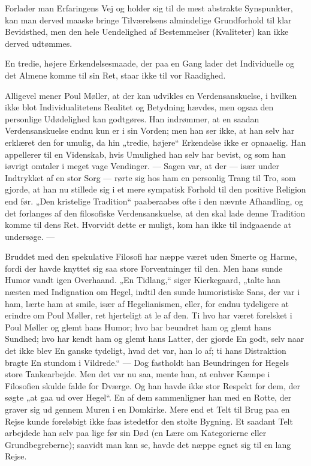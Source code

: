 \documentclass[12pt,a4paper,openany]{book}
\newcommand{\opage}[1]{\marginnote{\footnotesize\textit{[#1]}}}
\begin{document}
Forlader man Erfaringens Vej og holder sig til de mest abstrakte Synspunkter,
kan man derved maaske bringe Tilværelsens almindelige Grundforhold til klar
Bevidsthed, men den hele Uendelighed af Bestemmelser (Kvaliteter) kan ikke
derved udtømmes.

En tredie, højere Erkendelsesmaade, der paa en Gang lader det Individuelle og
det Almene komme til sin Ret, staar ikke til vor Raadighed.

Alligevel mener Poul Møller, at der kan udvikles en Verdensanskuelse, i hvilken
ikke blot Individualitetens Realitet og Betydning hævdes, men ogsaa den
personlige Udødelighed kan godtgøres. Han indrømmer, at en saadan
Verdensanskuelse endnu kun er i sin Vorden; men han ser ikke, at han selv har
erklæret den for umulig, da hin „tredie, højere“
\setcounter{footnote}{0}%
\opage{121}Erkendelse ikke er opnaaelig. Han appellerer til en Videnskab, hvis
Umulighed han selv har bevist, og som han iøvrigt omtaler i meget vage
Vendinger. --- Sagen var, at der --- især under Indtrykket af en stor Sorg ---
rørte sig hos ham en personlig Trang til Tro, som gjorde, at han nu stillede
sig i et mere sympatisk Forhold til den positive Religion end før. „Den
kristelige Tradition“ paaberaabes ofte i den nævnte Afhandling, og det
forlanges af den filosofiske Verdensanskuelse, at den skal lade denne Tradition
komme til dens Ret. Hvorvidt dette er muligt, kom han ikke til indgaaende at
undersøge. ---

Bruddet med den spekulative Filosofi har næppe været uden Smerte og Harme,
fordi der havde knyttet sig saa store Forventninger til den. Men hans sunde
Humor vandt igen Overhaand. „En Tidlang,“ siger Kierkegaard, „talte han næsten
med Indignation om Hegel, indtil den sunde humoristiske Sans, der var i ham,
lærte ham at smile, især af Hegelianismen, eller, for endnu tydeligere at
erindre om Poul Møller, ret hjerteligt at le af den. Ti hvo har været forelsket
i Poul Møller og glemt hans Humor; hvo har beundret ham og glemt hans Sundhed;
hvo har kendt ham og glemt hans Latter, der gjorde En godt, selv naar det ikke
blev En ganske tydeligt, hvad det var, han lo af; ti hans Distraktion bragte En
stundom i Vildrede.“ --- Dog fastholdt han Beundringen for Hegels store
Tankearbejde. Men det var nu saa, mente han, at enhver Kæmpe i Filosofien
skulde falde for Dværge. Og han havde ikke stor Respekt for dem, der søgte „at
gaa ud over Hegel“. En af dem sammenligner han med en Rotte, der graver sig ud
gennem Muren i en Domkirke. Mere end et Telt til Brug paa en Rejse kunde
foreløbigt ikke faas istedetfor den stolte Bygning. Et saadant Telt arbejdede
han selv paa lige før sin Død (en Lære om Kategorierne eller Grundbegreberne);
saavidt man kan se, havde det næppe egnet sig til en lang Rejse.
\end{document}
